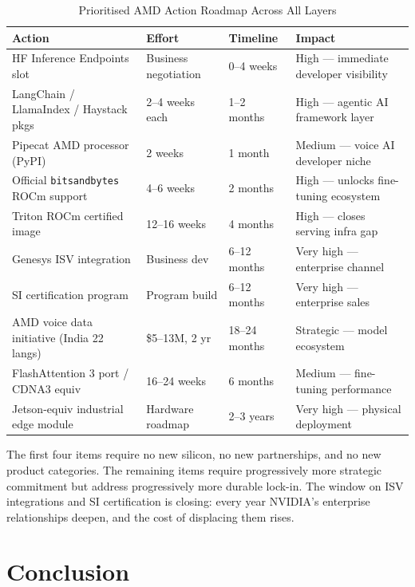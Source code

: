 \documentclass[12pt,a4paper]{article}
\begin{document}
\begin{table}[H]\centering
\caption{Prioritised AMD Action Roadmap Across All Layers}
\label{tab:roadmap}
\small
\begin{tabularx}{\textwidth}{L{4.4cm}L{2.0cm}L{2.0cm}X}
\toprule
\textbf{Action} & \textbf{Effort} & \textbf{Timeline} & \textbf{Impact} \\
\midrule
HF Inference Endpoints slot            & Business negotiation & 0--4 weeks  & High --- immediate developer visibility \\
LangChain / LlamaIndex / Haystack pkgs & 2--4 weeks each      & 1--2 months & High --- agentic AI framework layer \\
Pipecat AMD processor (PyPI)           & 2 weeks              & 1 month     & Medium --- voice AI developer niche \\
Official \texttt{bitsandbytes} ROCm support & 4--6 weeks      & 2 months    & High --- unlocks fine-tuning ecosystem \\
Triton ROCm certified image            & 12--16 weeks         & 4 months    & High --- closes serving infra gap \\
Genesys ISV integration                & Business dev         & 6--12 months & Very high --- enterprise channel \\
SI certification program               & Program build        & 6--12 months & Very high --- enterprise sales \\
AMD voice data initiative (India 22 langs) & \$5--13M, 2 yr  & 18--24 months & Strategic --- model ecosystem \\
FlashAttention 3 port / CDNA3 equiv    & 16--24 weeks         & 6 months    & Medium --- fine-tuning performance \\
Jetson-equiv industrial edge module    & Hardware roadmap     & 2--3 years  & Very high --- physical deployment \\
\bottomrule
\end{tabularx}
\end{table}

The first four items require no new silicon, no new partnerships, and no new
product categories.  The remaining items require progressively more strategic
commitment but address progressively more durable lock-in.  The window on
ISV integrations and SI certification is closing: every year NVIDIA's
enterprise relationships deepen, and the cost of displacing them rises.

\section{Conclusion}
\label{sec:conclusion}
\end{document}
